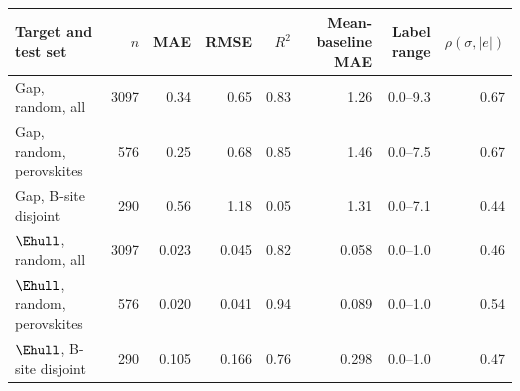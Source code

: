 \begin{tabular}{@{}lrrrrrrr@{}}\toprule
 Target and test set & $n$ & MAE & RMSE & $R^2$ & Mean-baseline MAE & Label range & $\rho(\sigma,|e|)$\\\midrule
Gap, random, all & 3097 & 0.34 & 0.65 & 0.83 & 1.26 & 0.0--9.3 & 0.67 \\
Gap, random, perovskites & 576 & 0.25 & 0.68 & 0.85 & 1.46 & 0.0--7.5 & 0.67 \\
Gap, B-site disjoint & 290 & 0.56 & 1.18 & 0.05 & 1.31 & 0.0--7.1 & 0.44 \\
$\Ehull$, random, all & 3097 & 0.023 & 0.045 & 0.82 & 0.058 & 0.0--1.0 & 0.46 \\
$\Ehull$, random, perovskites & 576 & 0.020 & 0.041 & 0.94 & 0.089 & 0.0--1.0 & 0.54 \\
$\Ehull$, B-site disjoint & 290 & 0.105 & 0.166 & 0.76 & 0.298 & 0.0--1.0 & 0.47 \\
\bottomrule\end{tabular}
